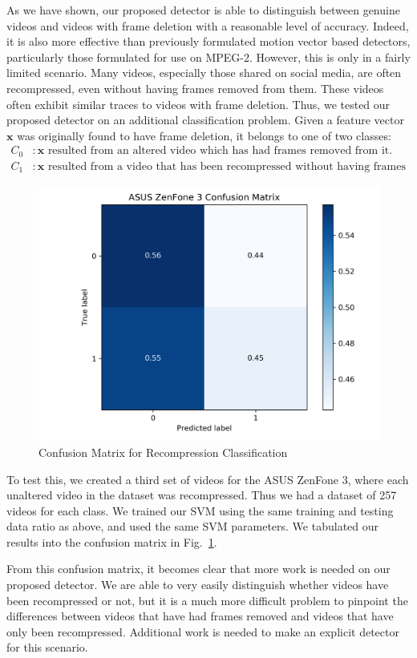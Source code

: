 As we have shown, our proposed detector is able to distinguish between genuine videos and videos with frame deletion with a reasonable level of accuracy. Indeed, it is also more effective than previously formulated motion vector based detectors, particularly those formulated for use on MPEG-2. However, this is only in a fairly limited scenario. Many videos, especially those shared on social media, are often recompressed, even without having frames removed from them. These videos often exhibit similar traces to videos with frame deletion. Thus, we tested our proposed detector on an additional classification problem. Given a feature vector $\bm{x}$ was originally found to have frame deletion, it belongs to one of two classes:%
%
\begin{equation}
\begin{aligned}
  C_{0} &: \bm{x} \text{ resulted from an altered video which has had frames removed from it.} \\
  C_{1} &: \bm{x} \text{ resulted from a video that has been recompressed without having frames removed.}
\end{aligned}
\end{equation}
%
\begin{figure}[htbp]
\centerline{\includegraphics[width=0.67\linewidth]{ExperimentalResults/normal_cm.png}}
\caption{Confusion Matrix for Recompression Classification}
\label{normalcm}
\end{figure}

To test this, we created a third set of videos for the ASUS ZenFone 3, where each unaltered video in the dataset was recompressed. Thus we had a dataset of 257 videos for each class. We trained our SVM using the same training and testing data ratio as above, and used the same SVM parameters. We tabulated our results into the confusion matrix in Fig.~\ref{normalcm}.

From this confusion matrix, it becomes clear that more work is needed on our proposed detector. We are able to very easily distinguish whether videos have been recompressed or not, but it is a much more difficult problem to pinpoint the differences between videos that have had frames removed and videos that have only been recompressed. Additional work is needed to make an explicit detector for this scenario.

